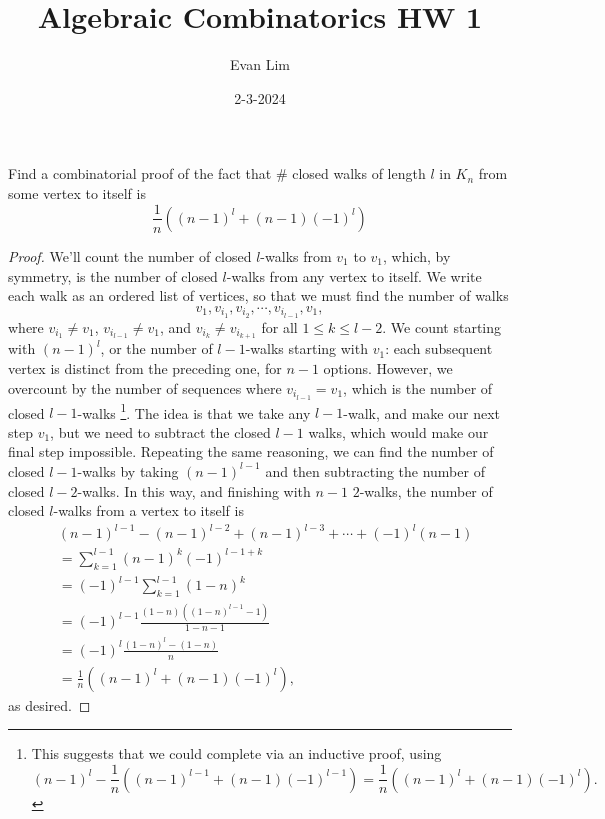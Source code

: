 \documentclass[11pt]{scrartcl}
\title{Algebraic Combinatorics HW 1}
\author{Evan Lim}
\date{2-3-2024}
\begin{document}
\maketitle
\setcounter{section}{1}
\begin{problem}[\textcolor{red}{Closed Walks in $K_n$}]
    Find a combinatorial proof of the fact that $\#$ closed walks of length $l$ in $K_n$ from some vertex to itself is \[\frac{1}{n}\left((n-1)^l+(n-1)(-1)^l\right)\]
\end{problem}
\begin{proof}
    We'll count the number of closed $l$-walks from $v_1$ to $v_1$, which, by symmetry, is the number of closed $l$-walks from any vertex to itself. We write each walk as an ordered list of vertices, so that we must find the number of walks \[v_1,v_{i_1},v_{i_2},\cdots,v_{i_{l-1}},v_1,\] where $v_{i_1}\neq v_1$, $v_{i_{l-1}}\neq v_1$, and $v_{i_k}\neq v_{i_{k+1}}$ for all $1\leq k\leq l-2$. We count starting with $(n-1)^l$, or the number of $l-1$-walks starting with $v_1$: each subsequent vertex is distinct from the preceding one, for $n-1$ options. However, we overcount by the number of sequences where $v_{i_{l-1}}=v_1$, which is the number of closed $l-1$-walks
    \footnote{This suggests that we could complete via an inductive proof, using \[(n-1)^{l}-\frac{1}{n}\left((n-1)^{l-1}+(n-1)(-1)^{l-1}\right)=\frac{1}{n}\left((n-1)^{l}+(n-1)(-1)^l\right).\]}. 
    The idea is that we take any $l-1$-walk, and make our next step $v_1$, but we need to subtract the closed $l-1$ walks, which would make our final step impossible. Repeating the same reasoning, we can find the number of closed $l-1$-walks by taking $(n-1)^{l-1}$ and then subtracting the number of closed $l-2$-walks. In this way, and finishing with $n-1$ $2$-walks, the number of closed $l$-walks from a vertex to itself is
    \begin{align*}
        &(n-1)^{l-1}-(n-1)^{l-2}+(n-1)^{l-3}+\cdots+(-1)^l(n-1)\\
        &=\sum_{k=1}^{l-1}(n-1)^k(-1)^{l-1+k}\\
        &=(-1)^{l-1}\sum_{k=1}^{l-1}(1-n)^k\\
        &=(-1)^{l-1}\frac{(1-n)\left((1-n)^{l-1}-1\right)}{1-n-1}\\
        &=(-1)^{l}\frac{(1-n)^{l}-(1-n)}{n}\\
        &=\frac{1}{n}\left((n-1)^l+(n-1)(-1)^l\right),
    \end{align*}
    as desired.
\end{proof}
\end{document}
